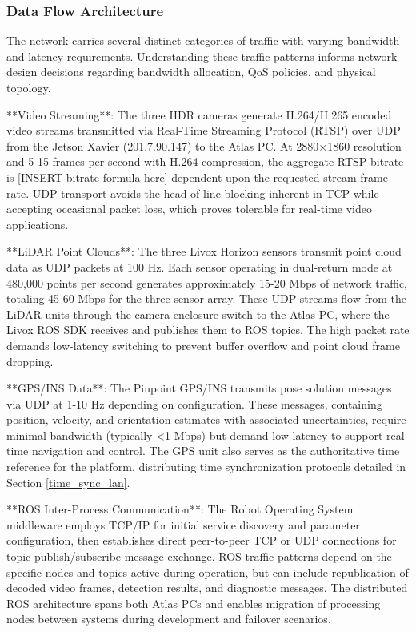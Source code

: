 \documentclass{erauthesis}
\begin{document}
\subsubsection{Data Flow Architecture}

The network carries several distinct categories of traffic with varying bandwidth and latency requirements. Understanding these traffic patterns informs network design decisions regarding bandwidth allocation, QoS policies, and physical topology.

**Video Streaming**: The three HDR cameras generate H.264/H.265 encoded video streams transmitted via Real-Time Streaming Protocol (RTSP) over UDP from the Jetson Xavier (201.7.90.147) to the Atlas PC. At 2880×1860 resolution and 5-15 frames per second with H.264 compression, the aggregate RTSP bitrate is [INSERT bitrate formula here] dependent upon the requested stream frame rate. UDP transport avoids the head-of-line blocking inherent in TCP while accepting occasional packet loss, which proves tolerable for real-time video applications.

**LiDAR Point Clouds**: The three Livox Horizon sensors transmit point cloud data as UDP packets at 100 Hz. Each sensor operating in dual-return mode at 480,000 points per second generates approximately 15-20 Mbps of network traffic, totaling 45-60 Mbps for the three-sensor array. These UDP streams flow from the LiDAR units through the camera enclosure switch to the Atlas PC, where the Livox ROS SDK receives and publishes them to ROS topics. The high packet rate demands low-latency switching to prevent buffer overflow and point cloud frame dropping.

**GPS/INS Data**: The Pinpoint GPS/INS transmits pose solution messages via UDP at 1-10 Hz depending on configuration. These messages, containing position, velocity, and orientation estimates with associated uncertainties, require minimal bandwidth (typically <1 Mbps) but demand low latency to support real-time navigation and control. The GPS unit also serves as the authoritative time reference for the platform, distributing time synchronization protocols detailed in Section \ref{time_sync_lan}.

**ROS Inter-Process Communication**: The Robot Operating System middleware employs TCP/IP for initial service discovery and parameter configuration, then establishes direct peer-to-peer TCP or UDP connections for topic publish/subscribe message exchange. ROS traffic patterns depend on the specific nodes and topics active during operation, but can include republication of decoded video frames, detection results, and diagnostic messages. The distributed ROS architecture spans both Atlas PCs and enables migration of processing nodes between systems during development and failover scenarios.
\end{document}
